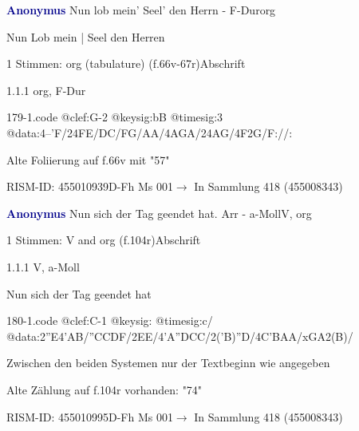 \documentclass[twocolumn, 12pt]{book}
\begin{document}
\par \vspace{16pt} \textcolor{darkblue}{\textbf{Anonymus  }}\hfillplus{\textbf{[179]}}\newline Nun lob mein' Seel' den Herrn - F-Dur\newline org
\par \begin{itshape}[f.66v, at left:] Nun Lob mein | Seel den Herren\end{itshape} 
\par \textcolor{darkblue}{}  1 Stimmen: org (tabulature)  (f.66v-67r)\newline Abschrift
\par 1.1.1  org, F-Dur  
\begin{filecontents*}{179-1.code}
@clef:G-2
@keysig:bB
@timesig:3
@data:4--'F/24FE/DC/FG/AA/4AGA/24AG/4F2G/F://:
\end{filecontents*}
\newline %
\par Alte Foliierung auf f.66v mit "57"
\par RISM-ID: 455010939\newline D-Fh  Ms 001\newline $\rightarrow$ In Sammlung 418 (455008343)
      
\par \vspace{16pt} \textcolor{darkblue}{\textbf{Anonymus  }}\hfillplus{\textbf{[180]}}\newline Nun sich der Tag geendet hat. Arr - a-Moll\newline V, org
\par \begin{itshape}\end{itshape} 
\par \textcolor{darkblue}{}  1 Stimmen: V and org  (f.104r)\newline Abschrift
\par 1.1.1  V, a-Moll\newline \begin{footnotesize} Nun sich der Tag geendet hat \end{footnotesize}  
\begin{filecontents*}{180-1.code}
@clef:C-1
@keysig:
@timesig:c/
@data:2''E4'AB/''CCDF/2EE/4'A''DCC/2('B)''D/4C'BAA/xGA2(B)/
\end{filecontents*}
\newline %
\par Zwischen den beiden Systemen nur der Textbeginn wie angegeben
\par Alte Zählung auf f.104r vorhanden: "74"
\par RISM-ID: 455010995\newline D-Fh  Ms 001\newline $\rightarrow$ In Sammlung 418 (455008343)
      
\end{document}
